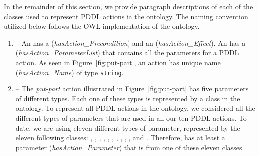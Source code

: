 In the remainder of this section, we provide paragraph descriptions of each of the classes used to represent PDDL actions in the  ontology. The naming convention utilized below follows the OWL implementation of the ontology.

\begin{enumerate}
\item {} -- An  has a  (\emph{hasAction\_Precondition}) and an  (\emph{hasAction\_Effect}). An  has a  (\emph{hasAction\_ParameterList}) that contains all the parameters for a PDDL action. As seen in Figure~\ref{fig:put-part}, an action has unique name (\emph{hasAction\_Name}) of type \texttt{string}.
\item {} -- The \textsl{put-part} action illustrated in Figure~\ref{fig:put-part} has five parameters of different types. Each one of these types is represented by a class in the  ontology. To represent all PDDL actions in the  ontology, we considered all the different types of parameters that are used in all our ten PDDL actions. To date, we are using eleven different types of parameter, represented by the eleven following classes: , , , , , , , , , , and . Therefore,  has at least a parameter (\emph{hasAction\_Parameter}) that is from one of these eleven classes.
    

\end{enumerate}
